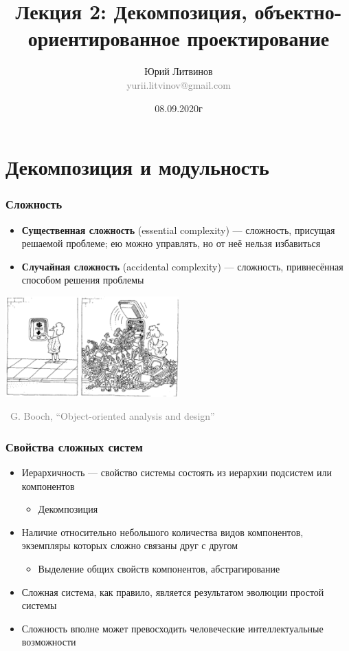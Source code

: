 \documentclass[xetex,mathserif,serif]{beamer}
\title[Декомпозиция, ООП]{Лекция 2: Декомпозиция, объектно-ориентированное проектирование}
\author[Юрий Литвинов]{Юрий Литвинов\\\small{\textcolor{gray}{yurii.litvinov@gmail.com}}}
\date{08.09.2020г}
\newcommand{\attribution}[1] {
	\begin{flushright}\begin{scriptsize}\textcolor{gray}{\textcopyright\, #1}\end{scriptsize}\end{flushright}
}
\begin{document}
	\frame{\titlepage}

	\section{Декомпозиция и модульность}

	\begin{frame}
		\frametitle{Сложность}
		\begin{itemize}
			\item \textbf{Существенная сложность} (essential complexity) --- сложность, присущая решаемой проблеме; ею можно управлять, но от неё нельзя избавиться
			\item \textbf{Случайная сложность} (accidental complexity) --- сложность, привнесённая способом решения проблемы
		\end{itemize}
		\vskip 0.5cm
		\begin{center}
			\includegraphics[width=0.5\textwidth]{complexityHiding.png}
		\end{center}
		\attribution{G. Booch, ``Object-oriented analysis and design''}
	\end{frame}

	\begin{frame}
		\frametitle{Свойства сложных систем}
		\begin{itemize}
			\item Иерархичность --- свойство системы состоять из иерархии подсистем или компонентов
			\begin{itemize}
				\item Декомпозиция
			\end{itemize}
			\item Наличие относительно небольшого количества видов компонентов, экземпляры которых сложно связаны друг с другом
			\begin{itemize}
				\item Выделение общих свойств компонентов, абстрагирование
			\end{itemize}
			\item Сложная система, как правило, является результатом эволюции простой системы
			\item Сложность вполне может превосходить человеческие интеллектуальные возможности
		\end{itemize}
	\end{frame}
\end{document}
